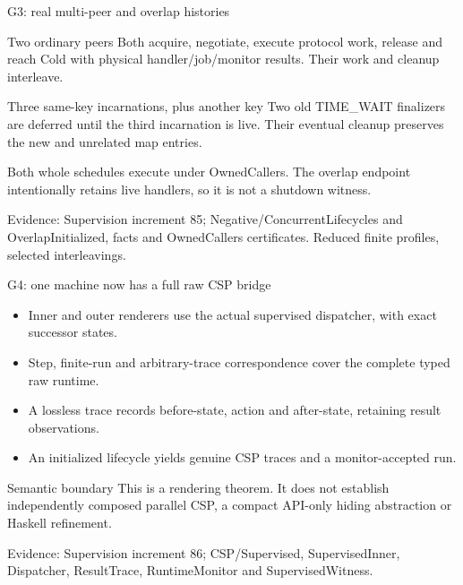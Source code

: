\documentclass[11pt,aspectratio=169]{beamer}
\newcommand{\evidence}[1]{\vfill{\fontsize{7}{8}\selectfont\color{Muted}Evidence: #1\par}}
\begin{document}
\begin{frame}{G3: real multi-peer and overlap histories}
\begin{block}{Two ordinary peers}
Both acquire, negotiate, execute protocol work, release and reach Cold with physical handler/job/monitor results. Their work and cleanup interleave.
\end{block}\begin{block}{Three same-key incarnations, plus another key}
Two old TIME\_WAIT finalizers are deferred until the third incarnation is live. Their eventual cleanup preserves the new and unrelated map entries.
\end{block}\small Both whole schedules execute under OwnedCallers. The overlap endpoint intentionally retains live handlers, so it is not a shutdown witness.
\evidence{Supervision increment 85; Negative/ConcurrentLifecycles and OverlapInitialized, facts and OwnedCallers certificates. Reduced finite profiles, selected interleavings.}
\end{frame}

\begin{frame}{G4: one machine now has a full raw CSP bridge}
\begin{itemize}\setlength\itemsep{1.8mm}
\item Inner and outer renderers use the actual supervised dispatcher, with exact successor states.
\item Step, finite-run and arbitrary-trace correspondence cover the complete typed raw runtime.
\item A lossless trace records before-state, action and after-state, retaining result observations.
\item An initialized lifecycle yields genuine CSP traces and a monitor-accepted run.
\end{itemize}\begin{alertblock}{Semantic boundary}
This is a rendering theorem. It does not establish independently composed parallel CSP, a compact API-only hiding abstraction or Haskell refinement.
\end{alertblock}
\evidence{Supervision increment 86; CSP/Supervised, SupervisedInner, Dispatcher, ResultTrace, RuntimeMonitor and SupervisedWitness.}
\end{frame}
\end{document}
